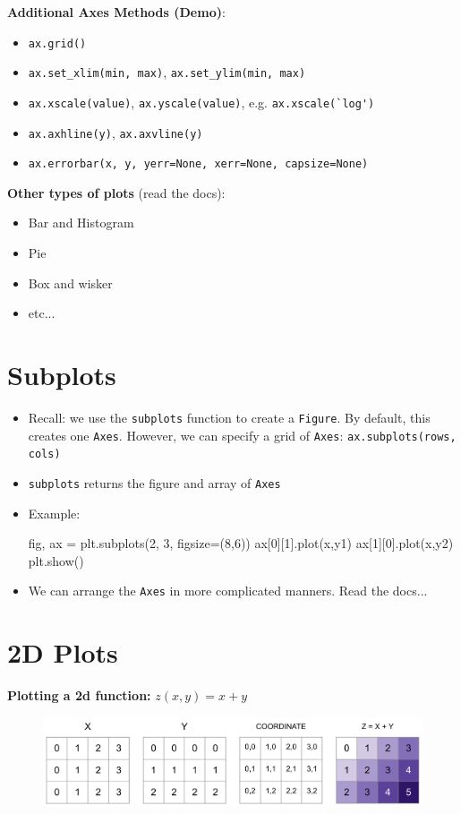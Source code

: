 \documentclass[12pt]{article}
\numberwithin{equation}{section}
\begin{document}
\textbf{Additional Axes Methods (Demo)}:
\begin{itemize}
    \item \verb|ax.grid()|
    \item \verb|ax.set_xlim(min, max)|, \verb|ax.set_ylim(min, max)|
    \item \verb|ax.xscale(value)|, \verb|ax.yscale(value)|, e.g. \verb|ax.xscale(`log')|
    \item \verb|ax.axhline(y)|, \verb|ax.axvline(y)|
    \item \verb|ax.errorbar(x, y, yerr=None, xerr=None, capsize=None)|
\end{itemize}

\textbf{Other types of plots} (read the docs):
\begin{itemize}
    \item Bar and Histogram
    \item Pie 
    \item Box and wisker
    \item etc...
\end{itemize}

\section{Subplots}
\begin{itemize}
    \item Recall: we use the \verb|subplots| function to create a \verb|Figure|. By default, this creates one \verb|Axes|. However, we can specify a grid of \verb|Axes|: \verb|ax.subplots(rows, cols)|
    \item \verb|subplots| returns the figure and array of \verb|Axes|
    \item Example:
    \begin{python}
    fig, ax = plt.subplots(2, 3, figsize=(8,6))
    ax[0][1].plot(x,y1)
    ax[1][0].plot(x,y2)
    plt.show()
    \end{python}
    \item We can arrange the \verb|Axes| in more complicated manners. Read the docs...
\end{itemize}

\section{2D Plots}

\textbf{Plotting a 2d function: }$z(x,y) = x+y$

\begin{figure}[H]
	    \centering
	    \includegraphics[width=15cm] {im}
\end{figure}
\end{document}
